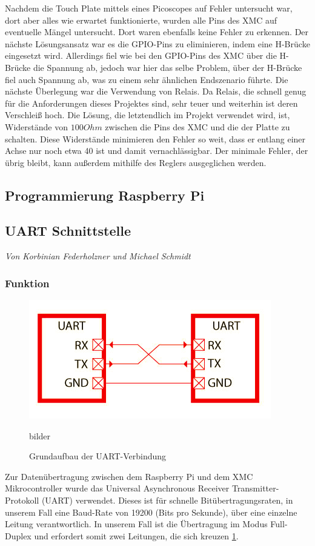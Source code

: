 \documentclass[12pt,a4paper,bibliography=totoc,listof=totoc]{scrartcl}
\begin{document}
Nachdem die Touch Plate mittels eines Picoscopes auf Fehler untersucht war, dort aber alles wie erwartet funktionierte, wurden alle Pins des XMC auf eventuelle Mängel untersucht. Dort waren ebenfalls keine Fehler zu erkennen.\newline
Der nächste Lösungsansatz war es die GPIO-Pins zu eliminieren, indem eine H-Brücke eingesetzt wird. Allerdings fiel wie bei den GPIO-Pins des XMC über die H-Brücke die Spannung ab,
jedoch war hier das selbe Problem, über der H-Brücke fiel auch Spannung ab, was zu einem sehr ähnlichen Endszenario führte. Die nächste Überlegung war die Verwendung von Relais. Da Relais, die schnell genug für die Anforderungen dieses Projektes sind, sehr teuer und weiterhin ist deren Verschleiß hoch.\newline
Die Lösung, die letztendlich im Projekt verwendet wird, ist, Widerstände von $100 Ohm$ zwischen die Pins des XMC und die der Platte zu schalten. Diese Widerstände minimieren den Fehler so weit, dass er entlang einer Achse nur noch etwa 40 ist und damit vernachlässigbar. Der minimale Fehler, der übrig bleibt, kann außerdem mithilfe des Reglers ausgeglichen werden.

\subsection{Programmierung Raspberry Pi}

\subsection{UART Schnittstelle}
\textit{Von Korbinian Federholzner und Michael Schmidt}\newline
\subsubsection{Funktion}
\begin{figure}[htbp]
	\centering
	\includegraphics[scale = 0.6]{pics/BildUart1}
	\caption{Grundaufbau der UART-Verbindung\cite {mikroe}}bilder 
	\label{fig:UART}
\end{figure}
Zur Datenübertragung zwischen dem Raspberry Pi und dem XMC Mikrocontroller wurde das Universal 
Asynchronous Receiver Transmitter-Protokoll (UART) verwendet. Dieses ist für schnelle Bitübertragungsraten, 
in unserem Fall eine Baud-Rate von 19200 (Bits pro Sekunde), über eine einzelne Leitung verantwortlich. 
In unserem Fall ist die Übertragung im Modus Full-Duplex und erfordert somit zwei Leitungen, die sich 
kreuzen \ref{fig:UART}.
\end{document}
